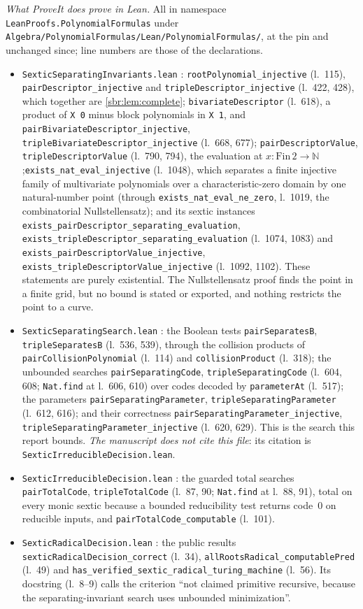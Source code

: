 \documentclass[11pt,letterpaper]{article}
\numberwithin{equation}{section}
\theoremstyle{definition}
\theoremstyle{remark}
\newcommand{\NN}{\mathbb N}
\newcommand{\src}[1]{\texttt{\nolinkurl{#1}}}
\begin{document}
\emph{What ProveIt does prove in Lean.} All in namespace
\src{LeanProofs.PolynomialFormulas} under
\src{Algebra/PolynomialFormulas/Lean/PolynomialFormulas/}, at the pin and
unchanged since; line numbers are those of the declarations.
\begin{itemize}
\item \src{SexticSeparatingInvariants.lean} \cite{repo-invariants}:
\src{rootPolynomial_injective} (l.~115), \src{pairDescriptor_injective} and
\src{tripleDescriptor_injective} (l.~422, 428), which together are
\cref{sbr:lem:complete}; \src{bivariateDescriptor} (l.~618), a product of
\src{X 0} minus block polynomials in \src{X 1}, and
\src{pairBivariateDescriptor_injective},
\src{tripleBivariateDescriptor_injective} (l.~668, 677);
\src{pairDescriptorValue}, \src{tripleDescriptorValue} (l.~790, 794), the
evaluation at $x\colon\mathrm{Fin}\,2\to\NN$;\src{exists_nat_eval_injective}
(l.~1048), which separates a finite injective family of multivariate
polynomials over a characteristic-zero domain by one natural-number point
(through \src{exists_nat_eval_ne_zero}, l.~1019, the combinatorial
Nullstellensatz); and its sextic instances
\src{exists_pairDescriptor_separating_evaluation},
\src{exists_tripleDescriptor_separating_evaluation} (l.~1074, 1083) and
\src{exists_pairDescriptorValue_injective},
\src{exists_tripleDescriptorValue_injective} (l.~1092, 1102). These
statements are purely existential. The Nullstellensatz proof finds the
point in a finite grid, but no bound is stated or exported, and nothing
restricts the point to a curve.
\item \src{SexticSeparatingSearch.lean} \cite{repo-separating-search}: the
Boolean tests \src{pairSeparatesB}, \src{tripleSeparatesB} (l.~536, 539),
through the collision products of \src{pairCollisionPolynomial} (l.~114) and
\src{collisionProduct} (l.~318); the unbounded searches
\src{pairSeparatingCode}, \src{tripleSeparatingCode} (l.~604, 608;
\src{Nat.find} at l.~606, 610) over codes decoded by \src{parameterAt}
(l.~517); the parameters \src{pairSeparatingParameter},
\src{tripleSeparatingParameter} (l.~612, 616); and their correctness
\src{pairSeparatingParameter_injective},
\src{tripleSeparatingParameter_injective} (l.~620, 629). This is the search
this report bounds. \emph{The manuscript does not cite this file}: its
citation \cite{repo-search} is \src{SexticIrreducibleDecision.lean}.
\item \src{SexticIrreducibleDecision.lean} \cite{repo-search}: the guarded
total searches \src{pairTotalCode}, \src{tripleTotalCode} (l.~87, 90;
\src{Nat.find} at l.~88, 91), total on every monic sextic because a bounded
reducibility test returns code~0 on reducible inputs, and
\src{pairTotalCode_computable} (l.~101).
\item \src{SexticRadicalDecision.lean} \cite{repo-decision}: the public
results \src{sexticRadicalDecision_correct} (l.~34),
\src{allRootsRadical_computablePred} (l.~49) and
\src{has_verified_sextic_radical_turing_machine} (l.~56). Its docstring
(l.~8--9) calls the criterion ``not claimed primitive recursive, because
the separating-invariant search uses unbounded minimization''.
\end{itemize}
\end{document}

